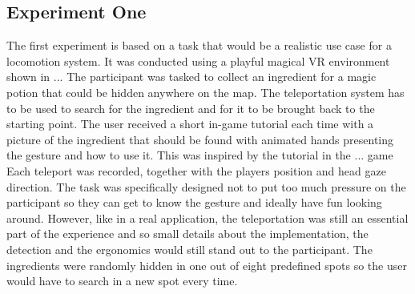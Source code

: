 
\subsection{Experiment One}
The first experiment is based on a task that would be a realistic use case for a locomotion system. It was conducted using a playful magical VR environment shown in ... %
The participant was tasked to collect an ingredient for a magic potion that could be hidden anywhere on the map. The teleportation system has to be used to search for the ingredient and for it to be brought back to the starting point. The user received a short in-game tutorial each time with a picture of the ingredient that should be found with animated hands presenting the gesture and how to use it. This was inspired by the tutorial in the ... game %
Each teleport was recorded, together with the players position and head gaze direction. The task was specifically designed not to put too much pressure on the participant so they can get to know the gesture and ideally have fun looking around. However, like in a real application, the teleportation was still an essential part of the experience and so small details about the implementation, the detection and the ergonomics would still stand out to the participant. The ingredients were randomly hidden in one out of eight predefined spots so the user would have to search in a new spot every time.


